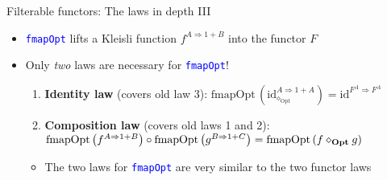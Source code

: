 \documentclass[english]{beamer}
\begin{document}
\begin{frame}{Filterable functors: The laws in depth III}
\begin{itemize}
\begin{itemize}
\begin{itemize}
\end{itemize}
\end{itemize}
\item \texttt{\textcolor{blue}{\footnotesize{}fmapOpt}} lifts a Kleisli
function $f^{A\Rightarrow1+B}$ into the functor $F$
\item Only \emph{two} laws are necessary for \texttt{\textcolor{blue}{\footnotesize{}fmapOpt}}!
\begin{enumerate}
\item \textbf{Identity law} (covers old law 3): $\text{fmapOpt}\,(\text{id}_{\diamond_{\text{Opt}}}^{A\Rightarrow1+A})=\text{id}^{F^{A}\Rightarrow F^{A}}$
\item \textbf{Composition law} (covers old laws 1 and 2): $\text{fmapOpt}\left(f^{A\Rightarrow1+B}\right)\circ\text{fmapOpt}\left(g^{B\Rightarrow1+C}\right)=\text{fmapOpt}\left(f\diamond_{\text{\textbf{Opt}}}g\right)$
\end{enumerate}
\begin{itemize}
\item The two laws for \texttt{\textcolor{blue}{\footnotesize{}fmapOpt}}
are very similar to the two functor laws
\end{itemize}
\end{itemize}
\end{frame}
\end{document}
